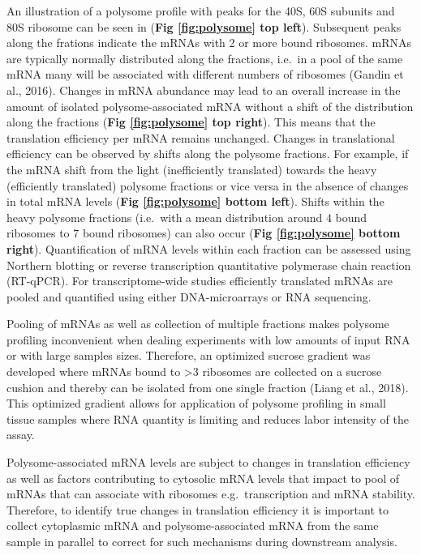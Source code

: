 \documentclass[12pt,openany]{book}
\begin{document}
An illustration of a polysome profile with peaks for the 40S, 60S
subunits and 80S ribosome can be seen in (\textbf{Fig \ref{fig:polysome}
top left}). Subsequent peaks along the frations indicate the mRNAs with
2 or more bound ribosomes. mRNAs are typically normally distributed
along the fractions, i.e.~in a pool of the same mRNA many will be
associated with different numbers of ribosomes (Gandin et al., 2016).
Changes in mRNA abundance may lead to an overall increase in the amount
of isolated polysome-associated mRNA without a shift of the distribution
along the fractions (\textbf{Fig \ref{fig:polysome} top right}). This
means that the translation efficiency per mRNA remains unchanged.
Changes in translational efficiency can be observed by shifts along the
polysome fractions. For example, if the mRNA shift from the light
(inefficiently translated) towards the heavy (efficiently translated)
polysome fractions or vice versa in the absence of changes in total mRNA
levels (\textbf{Fig \ref{fig:polysome} bottom left}). Shifts within the
heavy polysome fractions (i.e.~with a mean distribution around 4 bound
ribosomes to 7 bound ribosomes) can also occur (\textbf{Fig
\ref{fig:polysome} bottom right}). Quantification of mRNA levels within
each fraction can be assessed using Northern blotting or reverse
transcription quantitative polymerase chain reaction (RT-qPCR). For
transcriptome-wide studies efficiently translated mRNAs are pooled and
quantified using either DNA-microarrays or RNA sequencing.

Pooling of mRNAs as well as collection of multiple fractions makes
polysome profiling inconvenient when dealing experiments with low
amounts of input RNA or with large samples sizes. Therefore, an
optimized sucrose gradient was developed where mRNAs bound to
\textgreater{}3 ribosomes are collected on a sucrose cushion and thereby
can be isolated from one single fraction (Liang et al., 2018). This
optimized gradient allows for application of polysome profiling in small
tissue samples where RNA quantity is limiting and reduces labor
intensity of the assay.

Polysome-associated mRNA levels are subject to changes in translation
efficiency as well as factors contributing to cytosolic mRNA levels that
impact to pool of mRNAs that can associate with ribosomes
e.g.~transcription and mRNA stability. Therefore, to identify true
changes in translation efficiency it is important to collect cytoplasmic
mRNA and polysome-associated mRNA from the same sample in parallel to
correct for such mechanisms during downstream analysis.
\end{document}
